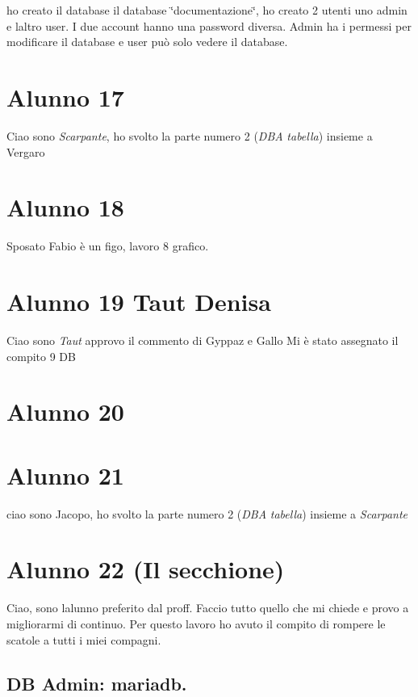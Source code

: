 ho creato il database il database \char`\"{}documentazione\char`\"{}, ho creato 2 utenti uno \textquotesingle{}admin\textquotesingle{} e l\textquotesingle{}altro \textquotesingle{}user\textquotesingle{}. I due account hanno una password diversa. Admin ha i permessi per modificare il database e user può solo vedere il database.

\section*{Alunno 17}

Ciao sono {\itshape Scarpante}, ho svolto la parte numero 2 ({\itshape D\+BA} {\itshape tabella}) insieme a Vergaro \section*{Alunno 18}

Sposato Fabio è un figo, lavoro 8 grafico. \section*{Alunno 19 Taut Denisa}

Ciao sono {\itshape Taut} approvo il commento di Gyppaz e Gallo Mi è stato assegnato il compito 9 DB \section*{Alunno 20}

\section*{Alunno 21}

ciao sono Jacopo, ho svolto la parte numero 2 ({\itshape D\+BA} {\itshape tabella}) insieme a {\itshape Scarpante}

\section*{Alunno 22 (Il secchione)}

Ciao, sono l\textquotesingle{}alunno preferito dal proff. Faccio tutto quello che mi chiede e provo a migliorarmi di continuo. Per questo lavoro ho avuto il compito di rompere le scatole a tutti i miei compagni.

\subsection*{DB Admin\+: mariadb.}

